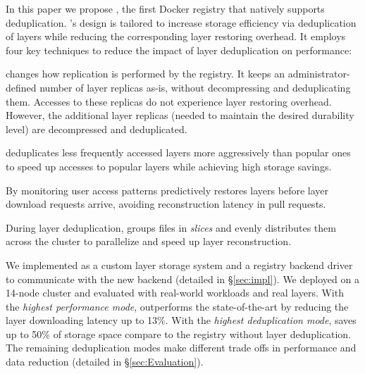 In this paper we propose \sysname, the first Docker registry that natively
supports deduplication.
%
\sysname's design is tailored to
increase storage efficiency via deduplication of layers while
reducing the corresponding layer restoring overhead.
%
It employs four key techniques to reduce
the impact of layer deduplication on performance: 
%
%
\begin{compactenumerate}
\item 
\sysname changes how replication is performed by the registry.
%
It keeps an administrator-defined
number of layer replicas as-is, without decompressing and deduplicating them.
%
Accesses to these replicas do not experience layer restoring overhead.
%
However, the additional layer replicas (needed
to maintain the desired durability level)
are decompressed and deduplicated.

\item \sysname deduplicates less frequently accessed layers more
aggressively than popular ones to speed up accesses to popular
layers while achieving high storage savings.
%
\item By monitoring user access patterns \sysname predictively
restores layers before layer download requests arrive,
avoiding reconstruction latency in pull requests.
%
\item During layer deduplication, \sysname groups files in \emph{slices} and evenly
distributes them across the cluster to parallelize and speed up layer reconstruction.
%
\end{compactenumerate}


We implemented \sysname as a custom layer storage system and
a registry backend driver to communicate
with the new backend (detailed in \S\ref{sec:impl}).
%
We deployed \sysname on a 14-node cluster and evaluated with real-world
workloads and real layers.
%
With the \emph{highest performance mode}, \sysname outperforms the
state-of-the-art by reducing the layer downloading latency up to 13\%.
%
With the \emph{highest deduplication mode}, \sysname saves up to 50\% of
storage space compare to the registry without layer deduplication.
%
The remaining deduplication modes make different trade offs in performance and
data reduction (detailed in \S\ref{sec:Evaluation}).


%
